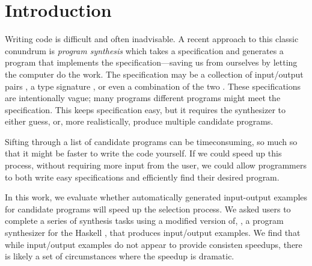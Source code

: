 \section{Introduction}
Writing code is difficult and often inadvisable. 
%
A recent approach to this classic conundrum is \emph{program synthesis} which
takes a specification and generates a program that implements the
specification---saving us from ourselves by letting the computer do the work.
%
The specification may be a collection of input/output pairs
\cite{Feser_Chaudhuri_Dillig_2015}, a type signature \cite{hoogle_plus_2020},
or even a combination of the two \cite{Osera_Zdancewic_2015}.
%
These specifications are intentionally vague; many programs different
programs might meet the specification.
%
This keeps specification easy, but it requires the synthesizer to either guess,
or, more realistically, produce multiple candidate programs.

Sifting through a list of candidate programs can be timeconsuming, so much so
that it might be faster to write the code yourself.
%
If we could speed up this process, without requiring more input from the
user, we could allow programmers to both write easy specifications and
efficiently find their desired program.

In this work, we evaluate whether automatically generated input-output examples
for candidate programs will speed up the selection process.
%
We asked users to complete a series of synthesis tasks using a modified
version of, \hoogleplus, a program synthesizer for the Haskell
\cite{hoogle_plus_2020}, that produces input/output examples.
%
We find that while input/output examples do not appear to provide consisten
speedups, there is likely a set of circumstances where the speedup is
dramatic.
